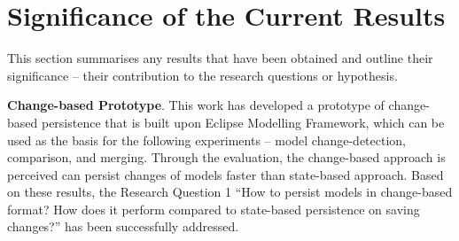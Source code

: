 \documentclass[12pt, a4paper]{report} \usepackage[titletoc]{appendix}
\begin{document}


\section{Significance of the Current Results}
\label{sec:significance_and_contribution_of_current_results}
This section summarises any results that have been obtained and outline their significance -- their contribution to the research questions or hypothesis.

\textbf{Change-based Prototype}. This work has developed a prototype of change-based persistence that is built upon Eclipse Modelling Framework, which can be used as the basis for the following experiments -- model change-detection, comparison, and merging. Through the evaluation, the change-based approach is perceived can persist changes of models faster than state-based approach. Based on these results, the Research Question 1 ``How to persist models in change-based format? How does it perform compared to state-based persistence on saving changes?'' has been successfully addressed.
\end{document}
